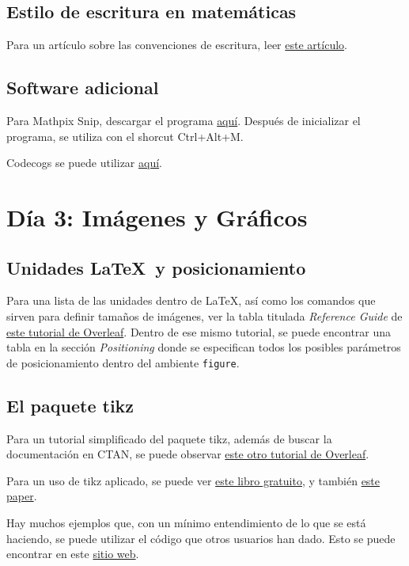 \documentclass[a4paper]{article}
\begin{document}
\subsection{Estilo de escritura en matemáticas}
Para un artículo sobre las convenciones de escritura, leer \href{http://www.tug.org/TUGboat/Articles/tb18-1/tb54becc.pdf}{este artículo}. 
\subsection{Software adicional}
Para Mathpix Snip, descargar el programa \href{https://mathpix.com/}{aquí}. Después de inicializar el programa, se utiliza con el shorcut Ctrl+Alt+M.

Codecogs se puede utilizar \href{https://latex.codecogs.com/eqneditor/editor.php}{aquí}.
\section{Día 3: Imágenes y Gráficos}
\subsection{Unidades \LaTeX\ y posicionamiento}
Para una lista de las unidades dentro de \LaTeX, así como los comandos que sirven para definir tamaños de imágenes, ver la tabla titulada \textit{Reference Guide} de \href{https://www.overleaf.com/learn/latex/Inserting_Images#Reference_guide}{este tutorial de Overleaf}. 
Dentro de ese mismo tutorial, se puede encontrar una tabla en la sección \textit{Positioning} donde se especifican todos los posibles parámetros de posicionamiento dentro del ambiente \texttt{figure}.
\subsection{El paquete \textsf{tikz}}
Para un tutorial simplificado del paquete \textsf{tikz}, además de buscar la documentación en CTAN, se puede observar \href{https://www.overleaf.com/learn/latex/TikZ_package}{este otro tutorial de Overleaf}.

Para un uso de \textsf{tikz} aplicado, se puede ver \href{https://play.google.com/books/reader?id=t3ZZDwAAQBAJ&hl=en_GB&pg=GBS.PP1}{este libro gratuito}, y también \href{http://static.latexstudio.net/wp-content/uploads/2016/06/tikzforeconomists-110619150244-phpapp01.pdf}{este paper}. 

Hay muchos ejemplos que, con un mínimo entendimiento de lo que se está haciendo, se puede utilizar el código que otros usuarios han dado. Esto se puede encontrar en este \href{https://texample.net/tikz/examples/area/economics}{sitio web}.
\end{document}
